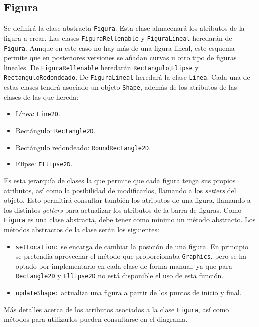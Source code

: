 \subsection{Figura}
Se definirá la clase abstracta \texttt{Figura}. Esta clase almacenará los atributos de la figura a crear. Las clases \texttt{FiguraRellenable} y \texttt{FiguraLineal} heredarán de \texttt{Figura}. Aunque en este caso no hay más de una figura lineal, este esquema permite que en posteriores versiones se añadan curvas u otro tipo de figuras lineales. \vskip0.3cm
De \texttt{FiguraRellenable} heredarán \texttt{Rectangulo},\texttt{Elipse} y \texttt{RectanguloRedondeado}. De \texttt{FiguraLineal} heredará la clase \texttt{Linea}. Cada una de estas clases tendrá asociado un objeto \texttt{Shape}, además de los atributos de las clases de las que hereda:\begin{itemize}
\item{Línea: \texttt{Line2D}.}
\item{Rectángulo: \texttt{Rectangle2D}.}
\item{Rectángulo redondeado: \texttt{RoundRectangle2D}.}
\item{Elipse: \texttt{Ellipse2D}.}
\end{itemize}
\vskip0.3cm
Es esta jerarquía de clases la que permite que cada figura tenga sus propios atributos, así como la posibilidad de modificarlos, llamando a los \textit{setters} del objeto.\vskip0.3cm
Esto permitirá consultar también los atributos de una figura, llamando a los distintos \textit{getters} para actualizar los atributos de la barra de figuras. Como \texttt{Figura} es una clase abstracta, debe tener como mínimo un método abstracto. Los métodos abstractos de la clase serán los siguientes:
\begin{itemize}
\item{\texttt{setLocation:} se encarga de cambiar la posición de una figura. En principio se pretendía aprovechar el método que proporcionaba \texttt{Graphics}, pero se ha optado por implementarlo en cada clase de forma manual, ya que para \texttt{Rectangle2D} y \texttt{Ellipse2D} no está disponible el uso de esta función.}
\item{\texttt{updateShape:} actualiza una figura a partir de los puntos de inicio y final.}
\end{itemize}
Más detalles acerca de los atributos asociados a la clase \texttt{Figura}, así como métodos para utilizarlos pueden consultarse en el diagrama.
\vskip0.3cm
